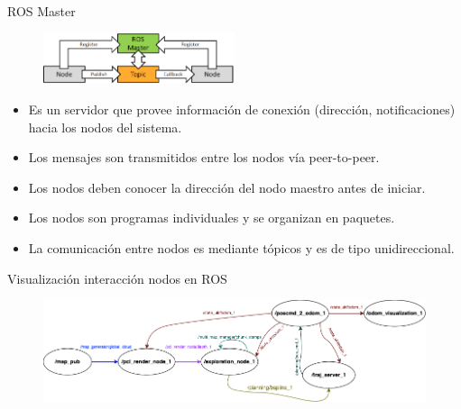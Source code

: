 \documentclass[
  24pt, %
  aspectratio=169, %
]{beamer}
\begin{document}

\begin{frame}{ROS Master}
  \begin{figure}
    \centering
    \includegraphics[width=0.5\textwidth]{ros_master}
  \end{figure}
  
  \begin{itemize}
    \item Es un servidor que provee información de conexión (dirección, notificaciones) hacia los nodos del sistema.
    \item Los mensajes son transmitidos entre los nodos vía peer-to-peer.
    \item Los nodos deben conocer la dirección del nodo maestro antes de iniciar.
    \item Los nodos son programas individuales y se organizan en paquetes.
    \item La comunicación entre nodos es mediante tópicos y es de tipo unidireccional.
  \end{itemize}
\end{frame}

\begin{frame}{Visualización interacción nodos en ROS}
  \begin{figure}
    \centering
    \includegraphics[width=1\textwidth]{ros_nodes}
  \end{figure}
\end{frame}
\end{document}
